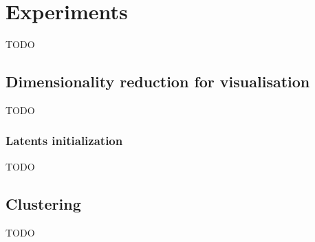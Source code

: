 
\section{Experiments}

TODO

\subsection{Dimensionality reduction for visualisation}

TODO

\subsubsection{Latents initialization}

TODO

\subsection{Clustering}

TODO
